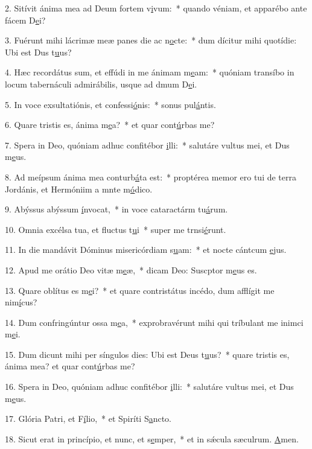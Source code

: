 2. Sitívit ánima mea ad Deum fortem v\uline{i}vum:~* quando véniam, et apparébo ante fácem D\uline{e}i?\par 
3. Fuérunt mihi lácrimæ meæ panes die ac n\uline{o}cte:~* dum dícitur mihi quotídie: Ubi est Dus t\uline{u}us?\par 
4. Hæc recordátus sum, et effúdi in me ánimam m\uline{e}am:~* quóniam transíbo in locum tabernáculi admirábilis, usque ad dmum D\uline{e}i.\par 
5. In voce exsultatiónis, et confessi\uline{ó}nis:~* sonus pul\uline{á}ntis.\par 
6. Quare tristis es, ánima m\uline{e}a?~* et quar cont\uline{ú}rbas me?\par 
7. Spera in Deo, quóniam adhuc confitébor \uline{i}lli:~* salutáre vultus mei, et Dus m\uline{e}us.\par 
8. Ad meípsum ánima mea conturb\uline{á}ta est:~* proptérea memor ero tui de terra Jordánis, et Hermóniim a mnte m\uline{ó}dico.\par 
9. Abýssus abýssum \uline{í}nvocat,~* in voce cataractárm tu\uline{á}rum.\par 
10. Omnia excélsa tua, et fluctus t\uline{u}i~* super me trnsi\uline{é}runt.\par 
11. In die mandávit Dóminus misericórdiam s\uline{u}am:~* et nocte cántcum \uline{e}jus.\par 
12. Apud me orátio Deo vitæ m\uline{e}æ,~* dicam Deo: Suscptor m\uline{e}us es.\par 
13. Quare oblítus es m\uline{e}i?~* et quare contristátus incédo, dum afflígit me nim\uline{í}cus?\par 
14. Dum confringúntur ossa m\uline{e}a,~* exprobravérunt mihi qui tríbulant me inimci m\uline{e}i.\par 
15. Dum dicunt mihi per síngulos dies: Ubi est Deus t\uline{u}us?~* quare tristis es, ánima mea? et quar cont\uline{ú}rbas me?\par 
16. Spera in Deo, quóniam adhuc confitébor \uline{i}lli:~* salutáre vultus mei, et Dus m\uline{e}us.\par 
17. Glória Patri, et F\uline{í}lio,~* et Spiríti S\uline{a}ncto.\par 
18. Sicut erat in princípio, et nunc, et s\uline{e}mper,~* et in sǽcula sæculrum. \uline{A}men.\par 
